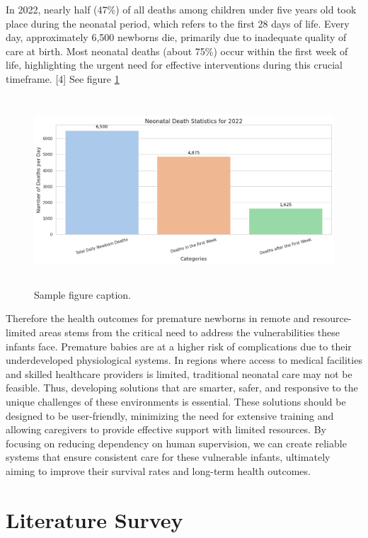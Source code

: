 \documentclass{article}
\begin{document}
In 2022, nearly half (47\%) of all deaths among children under five
years old took place during the neonatal period, which refers to the
first 28 days of life. Every day, approximately 6,500 newborns die,
primarily due to inadequate quality of care at birth. Most neonatal
deaths (about 75\%) occur within the first week of life, highlighting
the urgent need for effective interventions during this crucial
timeframe. {[}4{]} See figure \ref{fig:fig2}

\begin{figure}
  \centering
  \includegraphics[width=350pt,height=200pt]{images/clipboard-3806704517.png} %
  \caption{Sample figure caption.}
  \label{fig:fig2}
\end{figure}

Therefore the health outcomes for premature newborns in remote and
resource-limited areas stems from the critical need to address the
vulnerabilities these infants face. Premature babies are at a higher
risk of complications due to their underdeveloped physiological systems.
In regions where access to medical facilities and skilled healthcare
providers is limited, traditional neonatal care may not be feasible.
Thus, developing solutions that are smarter, safer, and responsive to
the unique challenges of these environments is essential. These
solutions should be designed to be user-friendly, minimizing the need
for extensive training and allowing caregivers to provide effective
support with limited resources. By focusing on reducing dependency on
human supervision, we can create reliable systems that ensure consistent
care for these vulnerable infants, ultimately aiming to improve their
survival rates and long-term health outcomes.

\section{Literature Survey}\label{literature-survey}
\end{document}
